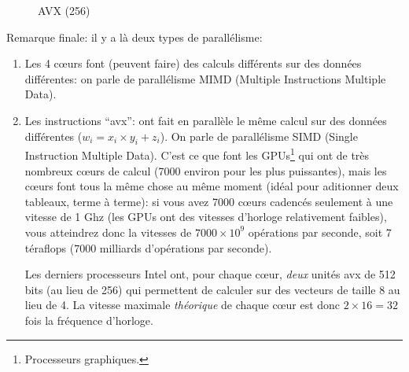 \begin{figure}
  \begin{center}
\end{center}
\caption{AVX (256)}
\label{avx}
\end{figure}
 Remarque finale: il y a là deux types de parallélisme:
  \begin{enumerate}
    \item Les 4 c{\oe}urs font (peuvent faire) des calculs différents
    sur des données différentes: on parle de parallélisme
    \textsf{MIMD} (Multiple Instructions Multiple Data).
    \item Les instructions ``avx'': ont fait en parallèle le même
    calcul sur des données différentes ($w_i = x_i\times y_i + z_i$). On
    parle de parallélisme \textsf{SIMD} (Single Instruction Multiple
    Data). C'est ce que font les GPUs\footnote{Processeurs
      graphiques.}  qui ont de très nombreux c{\oe}urs de calcul (7000
    environ pour les plus puissantes), mais les c{\oe}urs font tous la même
    chose au même moment (idéal 
    pour aditionner deux tableaux, terme à terme): si vous avez 7000
    c{\oe}urs cadencés seulement à une vitesse de 1 Ghz (les GPUs ont
      des vitesses d'horloge relativement faibles), vous atteindrez
      donc la vitesses de $7000 \times 10^9$ opérations par seconde,
      soit 7 téraflops ($ 7 000$ milliards d'opérations par seconde).

      Les derniers processeurs Intel ont, pour chaque c{\oe}ur,
      \emph{deux} unités avx de 512 bits (au lieu de 256) qui
      permettent de calculer
      sur des vecteurs de taille 8 au lieu de 4. La vitesse maximale
      \emph{théorique} de chaque c{\oe}ur est donc $2 \times 16 = 32$
      fois la fréquence d'horloge.
  \end{enumerate}
